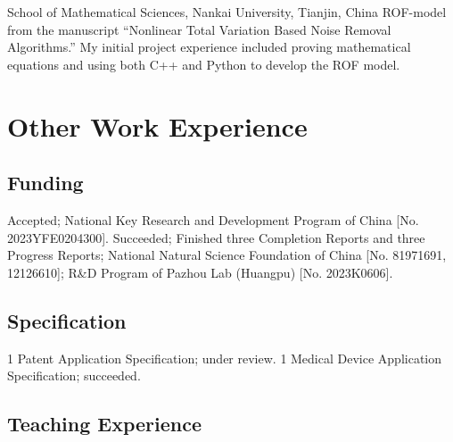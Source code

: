 \documentclass[11pt,a4paper, final]{moderncv}
\newcommand{\spacesection}{\vspace{0.4cm}}
\newcommand{\spacesubsection}{\vspace{0.2cm}}
\begin{document}
	{}{}{School of Mathematical Sciences, Nankai University, Tianjin, China}
	{ROF-model from the manuscript ``Nonlinear Total Variation Based Noise Removal Algorithms.''}
	{My initial project experience included proving mathematical equations and using both C++ and Python to develop the ROF model.}
\section{\textbf{Other Work Experience}}
	\subsection{\textbf{Funding}}
		{Accepted; National Key Research and Development Program of China [No. 2023YFE0204300].}
		{Succeeded; Finished three Completion Reports and three Progress Reports; 
		National Natural Science Foundation of China [No. 81971691, 12126610]; 
		R\&D Program of Pazhou Lab (Huangpu) [No. 2023K0606].}
	\subsection{\textbf{Specification}}
		{1 Patent Application Specification; under review.}
		{1 Medical Device Application Specification; succeeded.}
	\subsection{\textbf{Teaching Experience}}
\end{document}
